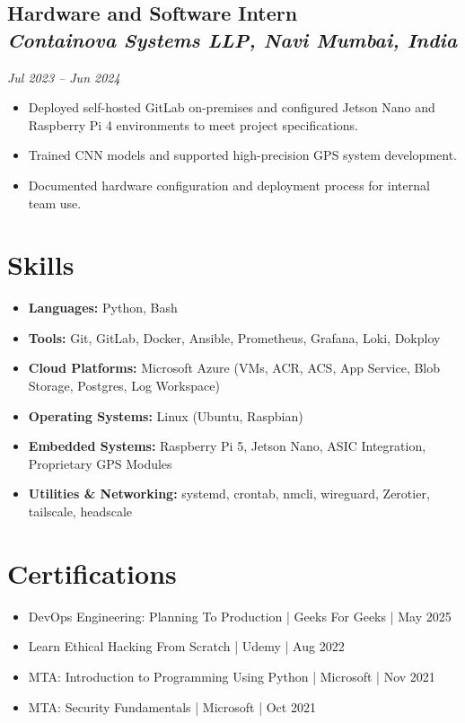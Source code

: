 \documentclass[a4paper,11pt]{article}
\begin{document}
\subsection*{Hardware and Software Intern \\
\textit{Containova Systems LLP, Navi Mumbai, India}}
\textit{Jul 2023 -- Jun 2024}
\begin{itemize}[leftmargin=*,labelsep=5pt]
    \item Deployed self-hosted GitLab on-premises and configured Jetson Nano and Raspberry Pi 4 environments to meet project specifications.
    \item Trained CNN models and supported high-precision GPS system development.
    \item Documented hardware configuration and deployment process for internal team use.
\end{itemize}

\section*{Skills}
\begin{itemize}[leftmargin=*,labelsep=5pt]
    \item \textbf{Languages:} Python, Bash
    \item \textbf{Tools:} Git, GitLab, Docker, Ansible, Prometheus, Grafana, Loki, Dokploy
    \item \textbf{Cloud Platforms:} Microsoft Azure (VMs, ACR, ACS, App Service, Blob Storage, Postgres, Log Workspace)
    \item \textbf{Operating Systems:} Linux (Ubuntu, Raspbian)
    \item \textbf{Embedded Systems:} Raspberry Pi 5, Jetson Nano, ASIC Integration, Proprietary GPS Modules
    \item \textbf{Utilities \& Networking:} systemd, crontab, nmcli, wireguard, Zerotier, tailscale, headscale
\end{itemize}


\section*{Certifications}
\begin{itemize}[leftmargin=*,labelsep=5pt]
    \item DevOps Engineering: Planning To Production | Geeks For Geeks | May 2025
    \item Learn Ethical Hacking From Scratch | Udemy | Aug 2022
    \item MTA: Introduction to Programming Using Python | Microsoft | Nov 2021
    \item MTA: Security Fundamentals | Microsoft | Oct 2021
\end{itemize}
\end{document}
